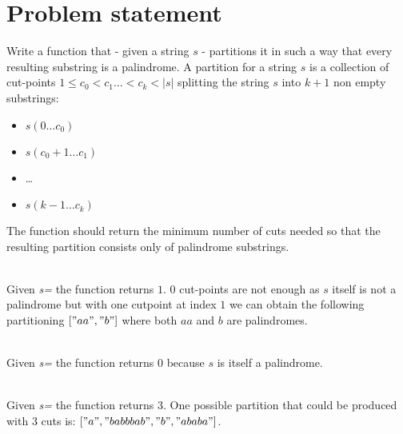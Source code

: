 \section{Problem statement}
\begin{exercise}
Write a function that - given a string $s$ - partitions it in such a way that every resulting substring is a
palindrome. A partition for a string $s$ is a collection of cut-points $1 \leq c_0 < c_1 \ldots <
c_k < |s|$ splitting the string $s$ into $k+1$ non empty substrings:
\begin{itemize}
	\item $s(0 \ldots c_0)$
	\item $s(c_0+1 \ldots c_1)$
	\item \ldots
	\item $s(k-1 \ldots c_k)$
\end{itemize}
The function should return the minimum number of cuts needed so that the resulting partition
consists only of palindrome substrings.

\begin{example}
		\hfill \\
		Given \textit{s=} the function returns $1$. $0$ cut-points are not enough as $s$ itself
		is not a palindrome but with one cutpoint at index $1$ we can obtain the following
		partitioning $["aa","b"]$ where both $aa$ and $b$ are palindromes. 
	\end{example}

	\begin{example}
		\hfill \\
		Given \textit{s=} the function returns $0$ because $s$ is itself a
		palindrome. 
	\end{example}

	\begin{example}
		\hfill \\
		Given \textit{s=} the function returns $3$. One possible partition that  could be
		produced with $3$ cuts is: $["a","babbbab","b","ababa"]$.
	\end{example}
\end{exercise}

%	

